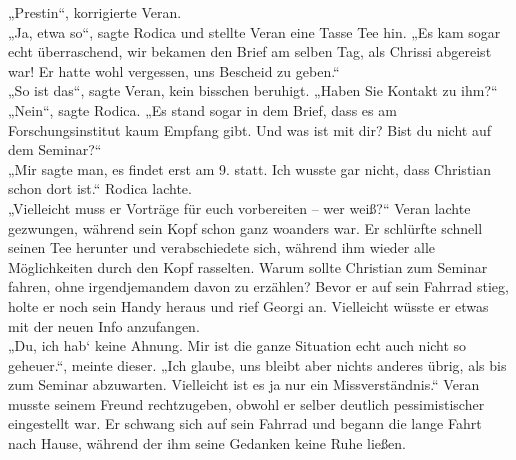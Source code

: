 \documentclass[oneside]{memoir}
\begin{document}
„Prestin“, korrigierte Veran. \\
„Ja, etwa so“, sagte Rodica und stellte Veran eine Tasse Tee hin. „Es kam sogar echt überraschend, wir bekamen den Brief am selben Tag, als Chrissi abgereist war! Er hatte wohl vergessen, uns Bescheid zu geben.“ \\
„So ist das“, sagte Veran, kein bisschen beruhigt. „Haben Sie Kontakt zu ihm?“ \\
„Nein“, sagte Rodica. „Es stand sogar in dem Brief, dass es am Forschungsinstitut kaum Empfang gibt. Und was ist mit dir? Bist du nicht auf dem Seminar?“ \\
„Mir sagte man, es findet erst am 9. statt. Ich wusste gar nicht, dass Christian schon dort ist.“
Rodica lachte. \\
„Vielleicht muss er Vorträge für euch vorbereiten – wer weiß?“
Veran lachte gezwungen, während sein Kopf schon ganz woanders war. Er schlürfte schnell seinen Tee herunter und verabschiedete sich, während ihm wieder alle Möglichkeiten durch den Kopf rasselten. Warum sollte Christian zum Seminar fahren, ohne irgendjemandem davon zu erzählen? Bevor er auf sein Fahrrad stieg, holte er noch sein Handy heraus und rief Georgi an. Vielleicht wüsste er etwas mit der neuen Info anzufangen. \\
„Du, ich hab‘ keine Ahnung. Mir ist die ganze Situation echt auch nicht so geheuer.“, meinte dieser. „Ich glaube, uns bleibt aber nichts anderes übrig, als bis zum Seminar abzuwarten. Vielleicht ist es ja nur ein Missverständnis.“ Veran musste seinem Freund rechtzugeben, obwohl er selber deutlich pessimistischer eingestellt war. Er schwang sich auf sein Fahrrad und begann die lange Fahrt nach Hause, während der ihm seine Gedanken keine Ruhe ließen.
\newpage
\thispagestyle{plain}
\end{document}
